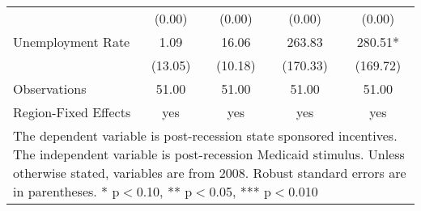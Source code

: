 \begin{table}[htbp]
\begin{tabular}{l*{4}{c}}
                    &      (0.00)   &      (0.00)   &      (0.00)   &      (0.00)   \\
Unemployment Rate   &        1.09   &       16.06   &      263.83   &      280.51*  \\
                    &     (13.05)   &     (10.18)   &    (170.33)   &    (169.72)   \\
\hline
Observations        &       51.00   &       51.00   &       51.00   &       51.00   \\
Region-Fixed Effects&         yes   &         yes   &         yes   &         yes   \\
\hline\hline
\multicolumn{5}{l}{\footnotesize The dependent variable is post-recession state sponsored incentives. The independent variable is post-recession Medicaid stimulus. Unless otherwise stated, variables are from 2008. Robust standard errors are in parentheses. * p$<$0.10, ** p$<$0.05, *** p$<$0.010}\\
\end{tabular}
\end{table}
